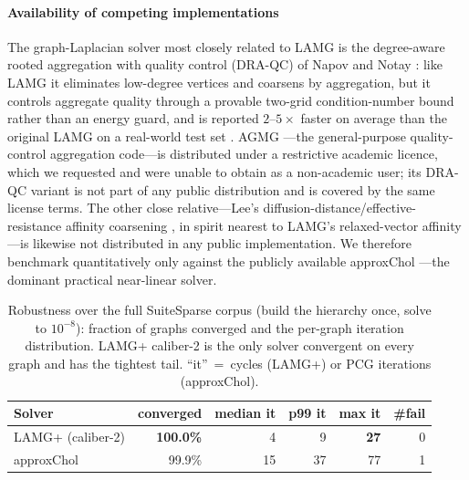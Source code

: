 \documentclass{siamart220329}
\begin{document}
\paragraph{Availability of competing implementations}
The graph-Laplacian solver most closely related to LAMG is the degree-aware rooted aggregation with
quality control (DRA-QC) of Napov and Notay \cite{napov-notay}: like LAMG it eliminates low-degree
vertices and coarsens by aggregation, but it controls aggregate quality through a provable two-grid
condition-number bound rather than an energy guard, and is reported $2$--$5\times$ faster on average
than the original LAMG on a real-world test set \cite{napov-notay}. AGMG \cite{notay}---the
general-purpose quality-control aggregation code---is distributed under a restrictive academic
licence, which we requested and were unable to obtain as a non-academic user; its DRA-QC variant is
not part of any public distribution and is covered by the same license terms. The other close relative---Lee's diffusion-distance/effective-resistance
affinity coarsening \cite{lee2024}, in spirit nearest to LAMG's relaxed-vector affinity---is likewise
not distributed in any public implementation. We therefore benchmark
quantitatively only against the publicly available approxChol \cite{laplacians,gks2023}---the
dominant practical near-linear solver.

\begin{table}[t]\centering
\caption{Robustness over the full SuiteSparse corpus (build the hierarchy once, solve to
$10^{-8}$): fraction of graphs converged and the per-graph iteration distribution. LAMG+
caliber-2 is the only solver convergent on every graph and has the tightest tail. ``it''~=~cycles
(LAMG+) or PCG iterations (approxChol).}\label{tab:draqc}
\begin{tabular}{lrrrrr}
\toprule
Solver & converged & median it & p99 it & max it & \#fail\\
\midrule
LAMG+ (caliber-2)         & \textbf{100.0\%} & 4  & 9  & \textbf{27}  & 0\\
approxChol \cite{gks2023} & 99.9\%           & 15 & 37 & 77           & 1\\
\bottomrule
\end{tabular}
\end{table}
\end{document}
